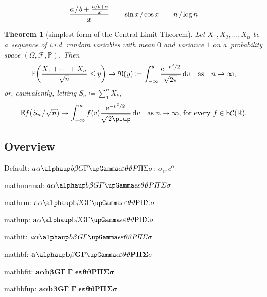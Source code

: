 \documentclass[12pt, a4paper, oneside]{article}
\newcommand{\mathup}[1]{\mathrm{#1}}
\newcommand{\mathbfit}[1]{\bm{#1}}
\newcommand{\mathbfup}[1]{\mathbf{#1}}
\newcommand*{\divslash}{%
	\mathbin{%
		\nonscript\mskip-2mu / \nonscript\mskip-2mu%
	}%
}  %
\theoremstyle{Plain}
\newtheorem{theorem}{Theorem}
\theoremstyle{Definition}
\theoremstyle{Remark}
\begin{document}
\begin{appendix}
{\boldmath $$\frac{a \divslash b + \frac{a \divslash b + c}{x}}{x} \qquad \sin x \divslash \cos x \qquad n \divslash \log n$$}

\begin{theorem}[simplest form of the Central Limit Theorem]
	\label{theorem:SFCLT}
	Let $X_1, X_2, \ldots, X_n$ be a~sequence of i.i.d. random variables with mean $0$
	and variance $1$ on a~probability space $(\Omega, \mathcal{F}, \mathbb{P})$. Then
	\[
		\mathbb{P}{\left(\frac{X_1+\cdots+X_n}{\sqrt{n}}\le y\right)} \to
		\mathfrak{N}(y) \coloneq
		\int_{-\infty}^y \frac{\mathup{e}^{-v^2 \divslash 2}}{\sqrt{2\mathup{\pi}}}\,\mathup{d}v
		\quad\text{as} \quad n\to\infty,
	\]
	or, equivalently, letting $S_n \coloneq \sum_1^n X_k$,
	\[
		\mathbb{E} f \big( S_n \divslash \sqrt{n} \big) \to
		\int_{-\infty}^\infty f(v) \frac{\mathup{e}^{-v^2 \divslash 2}}{\sqrt{2\piup}}\,\mathup{d}v
		\quad \mbox{as $n\to\infty$, for every $f \in \mathup{b}\mathcal{C}(\mathbb{R})$.}
	\]
\end{theorem}

\subsection{Overview \showfamily}

{\parindent 0pt
Default: $a \alpha \alphaup b \beta G \Gamma \upGamma \epsilon \varepsilon \theta \vartheta P \Pi \Sigma \sigma$; $\sigma_\epsilon, c^\alpha$

mathnormal: $\mathnormal{a \alpha \alphaup b \beta G \Gamma \upGamma \epsilon \varepsilon \theta \vartheta P \Pi \Sigma \sigma}$

mathrm: $\mathrm{a \alpha \alphaup b \beta G \Gamma \upGamma \epsilon \varepsilon \theta \vartheta P \Pi \Sigma \sigma}$

mathup: $\mathup{a \alpha \alphaup b \beta G \Gamma \upGamma \epsilon \varepsilon \theta \vartheta P \Pi \Sigma \sigma}$

mathit: $\mathit{a \alpha \alphaup b \beta G \Gamma \upGamma \epsilon \varepsilon \theta \vartheta P \Pi \Sigma \sigma}$

mathbf: $\mathbf{a \alphaup b \beta G \Gamma \upGamma \epsilon \varepsilon \theta \vartheta P \Pi \Sigma \sigma}$

mathbfit: $\mathbfit{a \alpha b \beta G \Gamma \upGamma \epsilon \varepsilon \theta \vartheta P \Pi \Sigma \sigma}$

mathbfup: $\mathbfup{a \alpha b \beta G \Gamma \upGamma \epsilon \varepsilon \theta \vartheta P \Pi \Sigma \sigma}$

}
\end{appendix}
\end{document}
